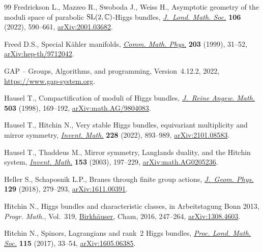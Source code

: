 \documentclass[pdftex]{sigma}
\numberwithin{equation}{section}
\theoremstyle{definition}
\begin{document}
\begin{thebibliography}{99}
Fredrickson L., Mazzeo R., Swoboda J., Weiss H., Asymptotic geometry of the
 moduli space of parabolic {${\rm SL}(2,{\mathbb C})$}-{H}iggs bundles,
 \href{https://doi.org/10.1112/jlms.12581}{\textit{J.~Lond. Math. Soc.}}
 \textbf{106} (2022), 590--661,
 \href{http://arxiv.org/abs/2001.03682}{arXiv:2001.03682}.

Freed D.S., Special {K}\"{a}hler manifolds,
 \href{https://doi.org/10.1007/s002200050604}{\textit{Comm. Math. Phys.}}
 \textbf{203} (1999), 31--52,
 \href{http://arxiv.org/abs/hep-th/9712042}{arXiv:hep-th/9712042}.

{{GAP} -- {G}roups}, {A}lgorithms, and programming, {V}ersion~4.12.2, 2022,
 \url{https://www.gap-system.org}.

Hausel T., Compactification of moduli of {H}iggs bundles,
 \href{https://doi.org/10.1515/crll.1998.096}{\textit{J.~Reine Angew. Math.}}
 \textbf{503} (1998), 169--192,
 \href{http://arxiv.org/abs/math.AG/9804083}{arXiv:math.AG/9804083}.

Hausel T., Hitchin N., Very stable {H}iggs bundles, equivariant multiplicity
 and mirror symmetry,
 \href{https://doi.org/10.1007/s00222-021-01093-7}{\textit{Invent. Math.}}
 \textbf{228} (2022), 893--989,
 \href{http://arxiv.org/abs/2101.08583}{arXiv:2101.08583}.

Hausel T., Thaddeus M., Mirror symmetry, {L}anglands duality, and the {H}itchin
 system, \href{https://doi.org/10.1007/s00222-003-0286-7}{\textit{Invent.
 Math.}} \textbf{153} (2003), 197--229,
 \href{http://arxiv.org/abs/math.AG0205236}{arXiv:math.AG0205236}.

Heller S., Schaposnik L.P., Branes through finite group actions,
 \href{https://doi.org/10.1016/j.geomphys.2018.03.014}{\textit{J.~Geom.
 Phys.}} \textbf{129} (2018), 279--293,
 \href{http://arxiv.org/abs/1611.00391}{arXiv:1611.00391}.

Hitchin N., Higgs bundles and characteristic classes, in Arbeitstagung {B}onn
 2013, \textit{Progr. Math.}, Vol.~319,
 \href{https://doi.org/10.1007/978-3-319-43648-7_8}{Birkh\"{a}user}, Cham,
 2016, 247--264, \href{http://arxiv.org/abs/1308.4603}{arXiv:1308.4603}.

Hitchin N., Spinors, {L}agrangians and rank~2 {H}iggs bundles,
 \href{https://doi.org/10.1112/plms.12034}{\textit{Proc. Lond. Math. Soc.}}
 \textbf{115} (2017), 33--54,
 \href{http://arxiv.org/abs/1605.06385}{arXiv:1605.06385}.


\end{thebibliography}
\end{document}
